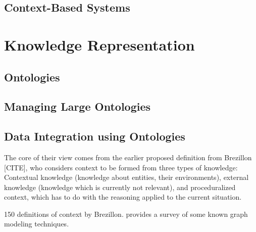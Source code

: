 \subsection{Context-Based Systems}

\section{Knowledge Representation}

\subsection{Ontologies}

\subsection{Managing Large Ontologies}

\subsection{Data Integration using Ontologies}

The core of their view comes from the earlier proposed definition from Brezillon [CITE], who considers context to be formed from three types of knowledge: Contextual knowledge (knowledge about entities, their environments), external knowledge (knowledge which is currently not relevant), and proceduralized context, which has to do with the reasoning applied to the current situation.

150 definitions of context by Brezillon.
 \cite{mostefaoui2004context} provides a survey of some known graph modeling techniques.